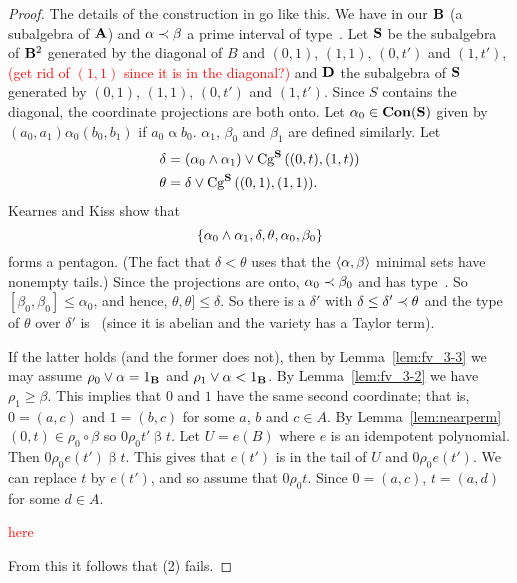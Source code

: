 \begin{proof}
The details of the construction in \cite{KearnesKiss1999}
go like this. We have in our $\mathbf{B}$ (a subalgebra of $\mathbf{A}$)
and $\alpha \prec\beta$ a prime interval of type~\atyp. 
Let $\mathbf{S}$ be the subalgebra of $\mathbf{B}^2$ generated by
the diagonal of $B$ and $(0,1)$, $(1,1)$, $(0,t')$ and $(1,t')$,
\textcolor{red}{(get rid of $(1,1)$ since it is in the diagonal?)}
and $\mathbf{D}$ the subalgebra of $\mathbf{S}$ generated by
$(0,1)$, $(1,1)$, $(0,t')$ and $(1,t')$. Since $S$ contains
the diagonal, the coordinate projections are both onto. 
Let $\alpha_0 \in \operatorname{\mathbf{Con}}(\mathbf{S})$ given by
$(a_0,a_1) \mathrel{\alpha_0} (b_0,b_1)$ if
$a_0 \mathrel \alpha b_0$. $\alpha_1$, $\beta_0$ and $\beta_1$
are defined similarly. Let 
\begin{align*}
\delta &= (\alpha_0 \meet \alpha_1)\join \Cga {(0,t)}{(1,t)} S\\
\theta &= \delta \join \Cga {(0,1)}{(1,1)} S.
\end{align*}
Kearnes and Kiss show that
\[
\{\alpha_0\meet\alpha_1, \delta, \theta, \alpha_0, \beta_0 \}
\]
forms a pentagon. (The fact that $\delta < \theta$ uses that
the $\langle \alpha,\beta\rangle$ minimal sets have nonempty tails.)
Since the projections are onto, $\alpha_0 \prec \beta_0$ and has
type~\atyp. So $[\beta_0,\beta_0] \le \alpha_0$, and hence,
$\theta,\theta] \le \delta$. So there is a $\delta'$ with
$\delta \le \delta' \prec \theta$ and the type of 
$\theta$ over $\delta'$ is \atyp\ (since it is abelian
and the variety has a Taylor term). 




\medskip



If the latter holds (and the former does not), then
by Lemma~\ref{lem:fv_3-3} we may 
assume $\rho_0 \join \alpha = 1_{\alg B}$ and
$\rho_1 \join \alpha < 1_{\alg B}$. By Lemma~\ref{lem:fv_3-2}
we have $\rho_1 \ge \beta$.
This implies that $0$ and $1$ have the same second coordinate; that is,
$0 = (a,c)$ and $1 = (b,c)$ for some $a$, $b$ and $c\in A$.
By Lemma~\ref{lem:nearperm} $(0,t) \in \rho_0 \circ \beta$
so $0 \mathrel {\rho_0} t' \mathrel{\beta} t$. Let $U = e(B)$
where $e$ is an idempotent polynomial. Then
$0 \mathrel {\rho_0} e(t') \mathrel{\beta} t$. This gives
that $e(t')$ is in the tail of $U$ and 
$0 \mathrel{\rho_0} e(t')$. We can
replace $t$ by $e(t')$, and so assume that 
$0 \mathrel{\rho_0} t$.
Since $0 = (a,c)$, $t = (a,d)$ for some $d\in A$. 

\textcolor{red}{here}

From this
it follows that (2) fails.




\end{proof}



